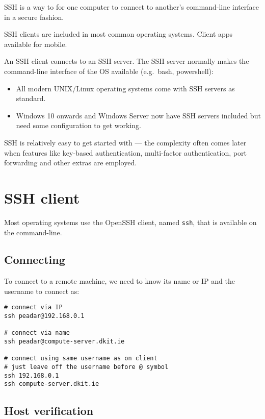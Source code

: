 \documentclass[slides]{pgnotes}
\begin{document}
SSH is a way to for one computer to connect to another's command-line interface in a secure fashion.

SSH clients are included in most common operating systems.
Client apps available for mobile. 

An SSH client connects to an SSH server.
The SSH server normally makes the command-line interface of the OS available (e.g.~bash, powershell):
\begin{itemize}
\item All modern UNIX/Linux operating systems come with SSH servers as standard.
\item Windows 10 onwards and Windows Server now have SSH servers included but need some configuration to get working.
\end{itemize}

SSH is relatively easy to get started with --- the complexity often comes
later when features like key-based authentication, multi-factor
authentication, port forwarding and other extras are employed.


\section{SSH client}
\label{ssh-client}

Most operating systems use the OpenSSH client, named \texttt{ssh}, that is available on the command-line.

\subsection{Connecting}

To connect to a remote machine, we need to know its name or IP and the username to connect as:

\begin{verbatim}
# connect via IP
ssh peadar@192.168.0.1

# connect via name
ssh peadar@compute-server.dkit.ie

# connect using same username as on client
# just leave off the username before @ symbol
ssh 192.168.0.1
ssh compute-server.dkit.ie
\end{verbatim}

\subsection{Host verification}
\end{document}

